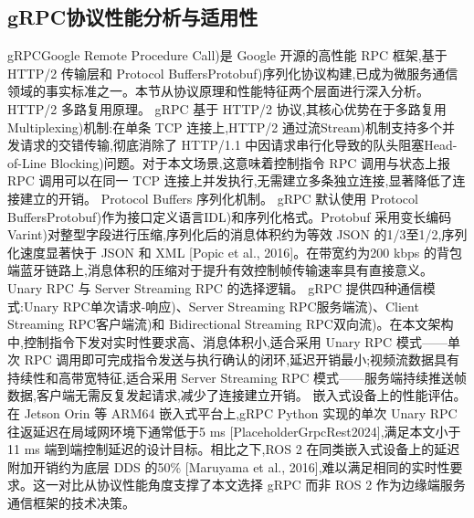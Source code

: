 \subsection{gRPC协议性能分析与适用性}
gRPCGoogle Remote Procedure Call)是 Google 开源的高性能 RPC 框架,基于 HTTP/2 传输层和 Protocol BuffersProtobuf)序列化协议构建,已成为微服务通信领域的事实标准之一。本节从协议原理和性能特征两个层面进行深入分析。
HTTP/2 多路复用原理。 gRPC 基于 HTTP/2 协议,其核心优势在于多路复用Multiplexing)机制:在单条 TCP 连接上,HTTP/2 通过流Stream)机制支持多个并发请求的交错传输,彻底消除了 HTTP/1.1 中因请求串行化导致的队头阻塞Head-of-Line Blocking)问题。对于本文场景,这意味着控制指令 RPC 调用与状态上报 RPC 调用可以在同一 TCP 连接上并发执行,无需建立多条独立连接,显著降低了连接建立的开销。
Protocol Buffers 序列化机制。 gRPC 默认使用 Protocol BuffersProtobuf)作为接口定义语言IDL)和序列化格式。Protobuf 采用变长编码Varint)对整型字段进行压缩,序列化后的消息体积约为等效 JSON 的1/3至1/2,序列化速度显著快于 JSON 和 XML [Popic et al., 2016]。在带宽约为200 kbps 的背包端蓝牙链路上,消息体积的压缩对于提升有效控制帧传输速率具有直接意义。
Unary RPC 与 Server Streaming RPC 的选择逻辑。 gRPC 提供四种通信模式:Unary RPC单次请求-响应)、Server Streaming RPC服务端流)、Client Streaming RPC客户端流)和 Bidirectional Streaming RPC双向流)。在本文架构中,控制指令下发对实时性要求高、消息体积小,适合采用 Unary RPC 模式——单次 RPC 调用即可完成指令发送与执行确认的闭环,延迟开销最小;视频流数据具有持续性和高带宽特征,适合采用 Server Streaming RPC 模式——服务端持续推送帧数据,客户端无需反复发起请求,减少了连接建立开销。
嵌入式设备上的性能评估。 在 Jetson Orin 等 ARM64 嵌入式平台上,gRPC Python 实现的单次 Unary RPC 往返延迟在局域网环境下通常低于5 ms [PlaceholderGrpcRest2024],满足本文小于11 ms 端到端控制延迟的设计目标。相比之下,ROS 2 在同类嵌入式设备上的延迟附加开销约为底层 DDS 的50\% [Maruyama et al., 2016],难以满足相同的实时性要求。这一对比从协议性能角度支撑了本文选择 gRPC 而非 ROS 2 作为边缘端服务通信框架的技术决策。
